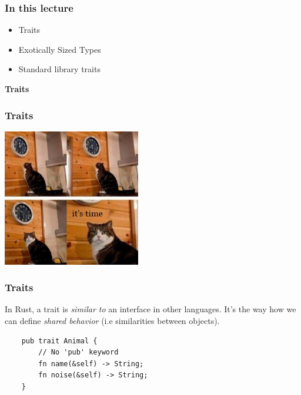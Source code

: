 \documentclass[aspectratio=1610,t]{beamer}
\begin{document}

\begin{frame}[fragile]
\frametitle{In this lecture}
\begin{itemize}
    \item Traits
    \item Exotically Sized Types
    \item Standard library traits
\end{itemize}
\end{frame}


\begin{frame}[c]
\centering\Huge\textbf{Traits}
\end{frame}


\begin{frame}[fragile]
\frametitle{Traits}

\center\includegraphics[height=6cm,keepaspectratio]{images/it's_time.jpg}

\end{frame}


\begin{frame}[fragile]
\frametitle{Traits}
In Rust, a trait is \textit{similar to} an interface in other languages. It's the way how we can define \textit{shared behavior} (i.e similarities between objects).

\begin{verbatim}
    pub trait Animal {
        // No 'pub' keyword
        fn name(&self) -> String;
        fn noise(&self) -> String;
    }
\end{verbatim}

\end{frame}
\end{document}
